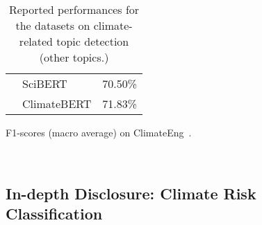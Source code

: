 \begin{table*}[ht]
\begin{subtable}[t]{0.48\textwidth}
{\begin{tabular}{llc}
            \citet{spokoyny2023answering} & SciBERT       & 70.50\%           \\
           \citet{spokoyny2023answering} & ClimateBERT    & 71.83\%           \\ \bottomrule
            \end{tabular}
        }
    \caption{F1-scores (macro average) on ClimateEng~\cite{vaid-etal-2022-towards}.}
    \label{tab:performance climateEng}
    \end{subtable}
    \caption{Reported performances for the datasets on climate-related topic detection (other topics.)}
    \label{tab:reported perf subtopic}
\end{table*}    

\newpage
~\newpage
~\newpage

\subsection{In-depth Disclosure: Climate Risk Classification}


